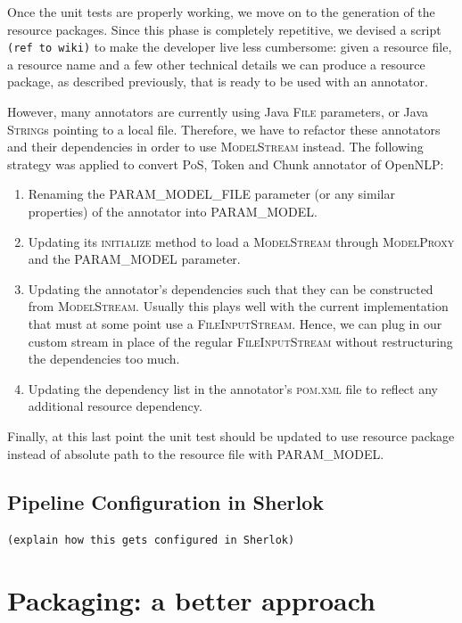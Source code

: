 \documentclass{article}
\newcommand{\id}[1]{\mbox{\textsc{#1}}}
\newcommand{\TODO}[1]{\texttt{\textcolor{YellowOrange}{(#1)}}} %
\begin{document}
Once the unit tests are properly working, we move on to the generation of the resource packages. Since this phase is completely repetitive, we devised a script \TODO{ref to wiki} to make the developer live less cumbersome: given a resource file, a resource name and a few other technical details we can produce a resource package, as described previously, that is ready to be used with an annotator.

However, many annotators are currently using Java \id{File} parameters, or Java \id{String}s pointing to a local file. Therefore, we have to refactor these annotators and their dependencies in order to use \id{ModelStream} instead. The following strategy was applied to convert PoS, Token and Chunk annotator of OpenNLP:

\begin{enumerate}

\item Renaming the \id{PARAM\_MODEL\_FILE} parameter (or any similar properties) of the annotator into \id{PARAM\_MODEL}.

\item Updating its \id{initialize} method to load a \id{ModelStream} through \id{ModelProxy} and the \id{PARAM\_MODEL} parameter.

\item Updating the annotator's dependencies such that they can be constructed from \id{ModelStream}. Usually this plays well with the current implementation that must at some point use a \id{FileInputStream}. Hence, we can plug in our custom stream in place of the regular \id{FileInputStream} without restructuring the dependencies too much.

\item Updating the dependency list in the annotator's \id{pom.xml} file to reflect any additional resource dependency.

\end{enumerate}

Finally, at this last point the unit test should be updated to use resource package instead of absolute path to the resource file with \id{PARAM\_MODEL}.

\subsection{Pipeline Configuration in Sherlok}

\TODO{explain how this gets configured in Sherlok}

\section{Packaging: a better approach}
\end{document}
